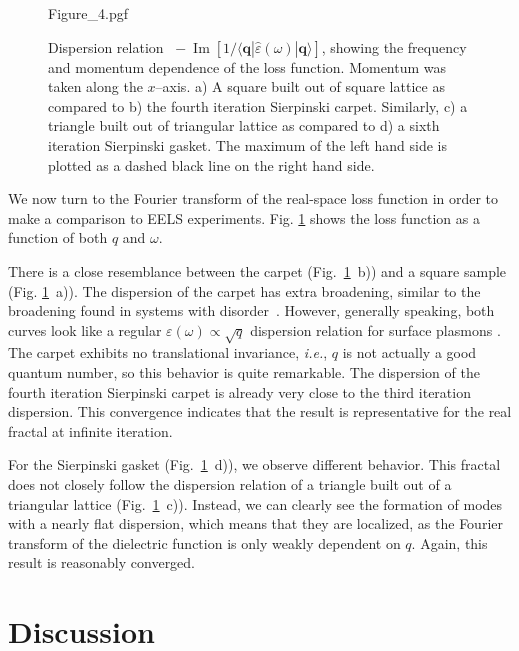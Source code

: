 \begin{figure}[t]
    \centering
    {Figure_4.pgf}
    \caption{Dispersion relation $\;-\!\operatorname{Im}[1 / \langle\mathbf{q}| \hat\varepsilon(\omega) |\mathbf{q}\rangle]$, showing the frequency and momentum dependence of the loss function. Momentum was taken along the $x$--axis. a) A square built out of square lattice as compared to b) the fourth iteration Sierpinski carpet. Similarly, c) a triangle built out of triangular lattice as compared to d) a sixth iteration Sierpinski gasket. The maximum of the left hand side is plotted as a dashed black line on the right hand side.}
    \label{fig:prb18:dispersion}
\end{figure}

We now turn to the Fourier transform of the real-space loss function in order to make a comparison to EELS experiments. Fig. \ref{fig:prb18:dispersion} shows the loss function as a function of both $q$ and $\omega$.

There is a close resemblance between the carpet (Fig.~\ref{fig:prb18:dispersion}~b)) and a square sample (Fig. \ref{fig:prb18:dispersion}~a)). The dispersion of the carpet has extra broadening, similar to the broadening found in systems with disorder~\cite{jin_screening_2015}. However, generally speaking, both curves look like a regular $\varepsilon(\omega) \propto \sqrt{q}$ dispersion relation for surface plasmons \cite{giuliani2005quantum}. The carpet exhibits no translational invariance, \textit{i.e.}, $q$ is not actually a good quantum number, so this behavior is quite remarkable. The dispersion of the fourth iteration Sierpinski carpet is already very close to the third iteration dispersion. This convergence indicates that the result is representative for the real fractal at infinite iteration.

For the Sierpinski gasket (Fig.~\ref{fig:prb18:dispersion}~d)), we observe different behavior. This fractal does not closely follow the dispersion relation of a triangle built out of a triangular lattice (Fig.~\ref{fig:prb18:dispersion}~c)).  Instead, we can clearly see the formation of modes with a nearly flat dispersion, which means that they are localized, as the Fourier transform of the dielectric function is only weakly dependent on $q$. Again, this result is reasonably converged.

\section{Discussion}

